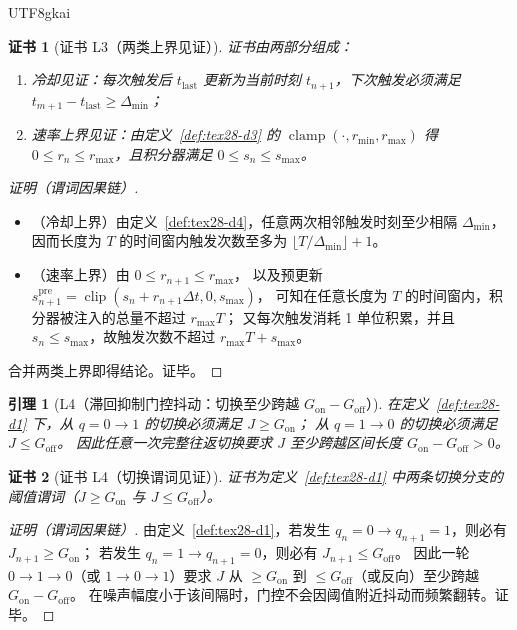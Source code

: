\documentclass[12pt]{article}
\newtheorem{lemma}{引理}[section]
\newtheorem{Certificate}{证书}[section]
\newcommand{\clip}{\operatorname{clip}}
\newcommand{\clamp}{\operatorname{clamp}}
\begin{document}
\begin{CJK*}{UTF8}{gkai}
\begin{Certificate}[证书 L3（两类上界见证）]
\label{cert:tex28-l3}
证书由两部分组成：
\begin{enumerate}
  \item 冷却见证：每次触发后 $t_{\mathrm{last}}$ 更新为当前时刻 $t_{n+1}$，下次触发必须满足 $t_{m+1}-t_{\mathrm{last}}\ge\Delta_{\min}$；
  \item 速率上界见证：由定义~\ref{def:tex28-d3} 的 $\clamp(\cdot,r_{\min},r_{\max})$ 得 $0\le r_{n}\le r_{\max}$，且积分器满足 $0\le s_n\le
    s_{\max}$。
\end{enumerate}
\end{Certificate}

\begin{proof}[证明（谓词因果链）]
\begin{itemize}
  \item（冷却上界）由定义~\ref{def:tex28-d4}，任意两次相邻触发时刻至少相隔 $\Delta_{\min}$，
  因而长度为 $T$ 的时间窗内触发次数至多为 $\lfloor T/\Delta_{\min}\rfloor+1$。
  \item（速率上界）由 $0\le r_{n+1}\le r_{\max}$，
  以及预更新 $s_{n+1}^{\mathrm{pre}}=\clip(s_n+r_{n+1}\Delta t,0,s_{\max})$，
  可知在任意长度为 $T$ 的时间窗内，积分器被注入的总量不超过 $r_{\max}T$；
  又每次触发消耗 1 单位积累，并且 $s_n\le s_{\max}$，故触发次数不超过 $r_{\max}T+s_{\max}$。
\end{itemize}
合并两类上界即得结论。证毕。
\end{proof}

\begin{lemma}[L4（滞回抑制门控抖动：切换至少跨越 $G_{\mathrm{on}}-G_{\mathrm{off}}$）]
\label{lem:tex28-l4}
在定义~\ref{def:tex28-d1} 下，从 $q=0\to 1$ 的切换必须满足 $J\ge G_{\mathrm{on}}$；
从 $q=1\to 0$ 的切换必须满足 $J\le G_{\mathrm{off}}$。
因此任意一次完整往返切换要求 $J$ 至少跨越区间长度 $G_{\mathrm{on}}-G_{\mathrm{off}}>0$。
\end{lemma}

\begin{Certificate}[证书 L4（切换谓词见证）]
\label{cert:tex28-l4}
证书为定义~\ref{def:tex28-d1} 中两条切换分支的阈值谓词（$J\ge G_{\mathrm{on}}$ 与 $J\le G_{\mathrm{off}}$）。
\end{Certificate}

\begin{proof}[证明（谓词因果链）]
由定义~\ref{def:tex28-d1}，若发生 $q_n=0\to q_{n+1}=1$，则必有 $J_{n+1}\ge G_{\mathrm{on}}$；
若发生 $q_n=1\to q_{n+1}=0$，则必有 $J_{n+1}\le G_{\mathrm{off}}$。
因此一轮 $0\to 1\to 0$（或 $1\to 0\to 1$）要求 $J$ 从 $\ge G_{\mathrm{on}}$ 到 $\le G_{\mathrm{off}}$（或反向）至少跨越 $G_{\mathrm{on}}
  -G_{\mathrm{off}}$。
在噪声幅度小于该间隔时，门控不会因阈值附近抖动而频繁翻转。证毕。
\end{proof}


\end{CJK*}
\end{document}
